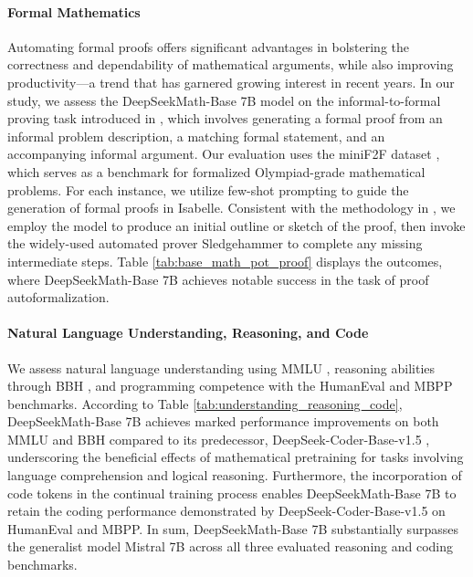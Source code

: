 \begin{itemize}[topsep=0pt]
\paragraph{Formal Mathematics}

Automating formal proofs offers significant advantages in bolstering the correctness and dependability of mathematical arguments, while also improving productivity—a trend that has garnered growing interest in recent years. In our study, we assess the DeepSeekMath-Base 7B model on the informal-to-formal proving task introduced in \citep{dsp_proof}, which involves generating a formal proof from an informal problem description, a matching formal statement, and an accompanying informal argument. Our evaluation uses the miniF2F dataset \citep{minif2f}, which serves as a benchmark for formalized Olympiad-grade mathematical problems. For each instance, we utilize few-shot prompting to guide the generation of formal proofs in Isabelle. Consistent with the methodology in \cite{dsp_proof}, we employ the model to produce an initial outline or sketch of the proof, then invoke the widely-used automated prover Sledgehammer \citep{sledgehammer} to complete any missing intermediate steps. Table \ref{tab:base_math_pot_proof} displays the outcomes, where DeepSeekMath-Base 7B achieves notable success in the task of proof autoformalization.

\paragraph{Natural Language Understanding, Reasoning, and Code}

We assess natural language understanding using MMLU \citep{mmlu}, reasoning abilities through BBH \citep{bbh}, and programming competence with the HumanEval \citep{codex} and MBPP \citep{mbpp} benchmarks. According to Table \ref{tab:understanding_reasoning_code}, DeepSeekMath-Base 7B achieves marked performance improvements on both MMLU and BBH compared to its predecessor, DeepSeek-Coder-Base-v1.5 \citep{deepseek-coder}, underscoring the beneficial effects of mathematical pretraining for tasks involving language comprehension and logical reasoning. Furthermore, the incorporation of code tokens in the continual training process enables DeepSeekMath-Base 7B to retain the coding performance demonstrated by DeepSeek-Coder-Base-v1.5 on HumanEval and MBPP. In sum, DeepSeekMath-Base 7B substantially surpasses the generalist model Mistral 7B \citep{mistral} across all three evaluated reasoning and coding benchmarks.


\end{itemize}
